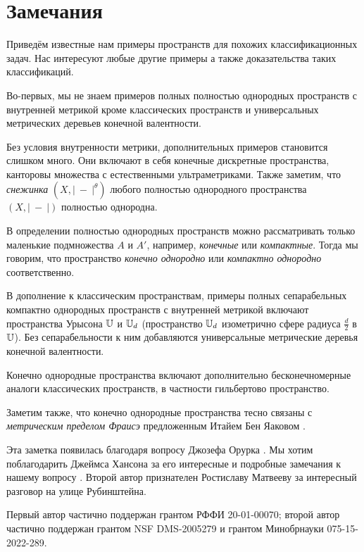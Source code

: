 \documentclass[a4paper,10pt]{article}
\begin{document}
\section{Замечания}

Приведём известные нам примеры пространств для похожих классификационных задач.
Нас интересуют любые другие примеры а также доказательства таких классификаций.

Во-первых, мы не знаем примеров полных полностью однородных пространств с внутренней метрикой кроме классических пространств и универсальных метрических деревьев конечной валентности.

Без условия внутренности метрики, дополнительных примеров становится слишком много.
Они включают в себя конечные дискретные пространства, канторовы множества с естественными ультраметриками.
Также заметим, что \emph{снежинка} $(X,|\ -\ |^\theta)$ любого полностью однородного пространства $(X,|\ -\ |)$ полностью однородна.

В определении полностью однородных пространств можно рассматривать только маленькие подмножества $A$ и $A'$,
например, \emph{конечные} или \emph{компактные}.
Тогда мы говорим, что пространство  \emph{конечно однородно} или  \emph{компактно однородно} соответственно.

В дополнение к классическим пространствам,
примеры полных сепарабельных компактно однородных пространств с внутренней метрикой включают пространства Урысона  $\mathbb{U}$ и $\mathbb{U}_d$ (пространство $\mathbb{U}_d$ изометрично сфере радиуса $\tfrac d2$ в $\mathbb{U}$).
Без сепарабельности к ним добавляются универсальные метрические деревья конечной валентности.

Конечно однородные пространства включают дополнительно бесконечномерные аналоги классических пространств,
в частности гильбертово пространство.

Заметим также, что конечно однородные пространства тесно связаны с \emph{метрическим пределом Фраисэ} предложенным Итайем Бен Яаковом \cite{ben-yaacov}. 

Эта заметка появилась благодаря вопросу Джозефа Орурка \cite{rourke}.
Мы хотим поблагодарить Джеймса Хансона за его интересные и подробные замечания к нашему вопросу \cite{hanson}.
Второй автор признателен Ростиславу Матвееву за интересный разговор на улице Рубинштейна.

Первый автор частично поддержан грантом РФФИ 20-01-00070;
второй автор частично поддержан грантом NSF DMS-2005279
и грантом Минобрнауки 075-15-2022-289.

{\sloppy
\printbibliography[heading=bibintoc]
\fussy
}
\end{document}
